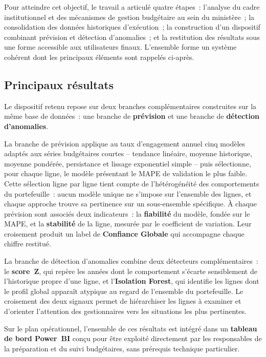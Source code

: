 \documentclass[12pt,a4paper]{article}
\begin{document}
Pour atteindre cet objectif, le travail a articul\'e quatre \'etapes~:
l'analyse du cadre institutionnel et des m\'ecanismes de gestion
budg\'etaire au sein du minist\`ere~; la consolidation des donn\'ees
historiques d'ex\'ecution~; la construction d'un dispositif combinant
pr\'evision et d\'etection d'anomalies~; et la restitution des r\'esultats
sous une forme accessible aux utilisateurs finaux. L'ensemble forme un
syst\`eme coh\'erent dont les principaux \'el\'ements sont rappel\'es
ci-apr\`es.

\subsection*{Principaux r\'esultats}

Le dispositif retenu repose sur deux branches compl\'ementaires construites
sur la m\^eme base de donn\'ees~: une branche de \textbf{pr\'evision} et une
branche de \textbf{d\'etection d'anomalies}.

La branche de pr\'evision applique au taux d'engagement annuel cinq mod\`eles
adapt\'es aux s\'eries budg\'etaires courtes -- tendance lin\'eaire, moyenne
historique, moyenne pond\'er\'ee, persistance et lissage exponentiel simple --
puis s\'electionne, pour chaque ligne, le mod\`ele pr\'esentant le MAPE de
validation le plus faible. Cette s\'election ligne par ligne tient compte de
l'h\'et\'erog\'en\'eit\'e des comportements du portefeuille~: aucun mod\`ele
unique ne s'impose sur l'ensemble des lignes, et chaque approche trouve sa
pertinence sur un sous-ensemble sp\'ecifique. \`A chaque pr\'evision sont
associ\'es deux indicateurs~: la \textbf{fiabilit\'e} du mod\`ele, fond\'ee
sur le MAPE, et la \textbf{stabilit\'e} de la ligne, mesur\'ee par le
coefficient de variation. Leur croisement produit un label de
\textbf{Confiance Globale} qui accompagne chaque chiffre restitu\'e.

La branche de d\'etection d'anomalies combine deux d\'etecteurs
compl\'ementaires~: le \textbf{score~Z}, qui rep\`ere les ann\'ees dont le
comportement s'\'ecarte sensiblement de l'historique propre d'une ligne, et
l'\textbf{Isolation Forest}, qui identifie les lignes dont le profil global
appara\^it atypique au regard de l'ensemble du portefeuille. Le croisement
des deux signaux permet de hi\'erarchiser les lignes \`a examiner et
d'orienter l'attention des gestionnaires vers les situations les plus
pertinentes.

Sur le plan op\'erationnel, l'ensemble de ces r\'esultats est int\'egr\'e
dans un \textbf{tableau de bord Power~BI} con\c{c}u pour \^etre exploit\'e
directement par les responsables de la pr\'eparation et du suivi
budg\'etaires, sans pr\'erequis technique particulier.
\end{document}
